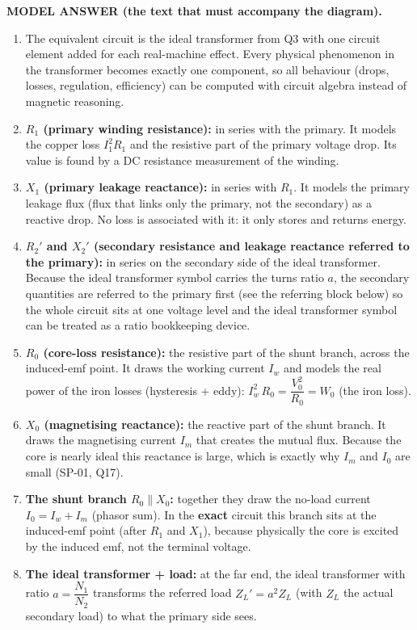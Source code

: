 \documentclass[11pt]{article}
\newcommand{\tagline}[1]{\textbf{\color{copper}#1}}
\begin{document}
\tagline{MODEL ANSWER (the text that must accompany the diagram).}
\begin{enumerate}[label=\arabic*.]
\item The equivalent circuit is the ideal transformer from Q3 with one circuit element added for each real-machine effect. Every physical phenomenon in the transformer becomes exactly one component, so all behaviour (drops, losses, regulation, efficiency) can be computed with circuit algebra instead of magnetic reasoning.
\item \textbf{$R_1$ (primary winding resistance):} in series with the primary. It models the copper loss $I_1^2 R_1$ and the resistive part of the primary voltage drop. Its value is found by a DC resistance measurement of the winding.
\item \textbf{$X_1$ (primary leakage reactance):} in series with $R_1$. It models the primary leakage flux (flux that links only the primary, not the secondary) as a reactive drop. No loss is associated with it: it only stores and returns energy.
\item \textbf{$R_2'$ and $X_2'$ (secondary resistance and leakage reactance referred to the primary):} in series on the secondary side of the ideal transformer. Because the ideal transformer symbol carries the turns ratio $a$, the secondary quantities are referred to the primary first (see the referring block below) so the whole circuit sits at one voltage level and the ideal transformer symbol can be treated as a ratio bookkeeping device.
\item \textbf{$R_0$ (core-loss resistance):} the resistive part of the shunt branch, across the induced-emf point. It draws the working current $I_w$ and models the real power of the iron losses (hysteresis + eddy): $I_w^{2}\, R_0 = \dfrac{V_0^{2}}{R_0} = W_0$ (the iron loss).
\item \textbf{$X_0$ (magnetising reactance):} the reactive part of the shunt branch. It draws the magnetising current $I_m$ that creates the mutual flux. Because the core is nearly ideal this reactance is large, which is exactly why $I_m$ and $I_0$ are small (SP-01, Q17).
\item \textbf{The shunt branch $R_0 \parallel X_0$:} together they draw the no-load current $I_0 = I_w + I_m$ (phasor sum). In the \textbf{exact} circuit this branch sits at the induced-emf point (after $R_1$ and $X_1$), because physically the core is excited by the induced emf, not the terminal voltage.
\item \textbf{The ideal transformer + load:} at the far end, the ideal transformer with ratio $a = \dfrac{N_1}{N_2}$ transforms the referred load $Z_L' = a^2 Z_L$ (with $Z_L$ the actual secondary load) to what the primary side sees.

\end{enumerate}
\end{document}
